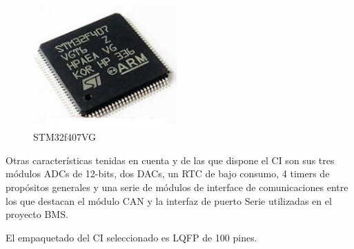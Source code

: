 \documentclass[10pt, a4paper]{report}
\begin{document}
\begin{figure}
    \includegraphics[width=5.5cm]{STM32F407VG.png}
    \caption{STM32f407VG}
    \label{fig:stm32f407vg}                                                            
\end{figure}                                                                 

Otras características tenidas en cuenta y de las que dispone el \acrshort{CI}
son sus tres módulos ADCs de 12-bits, dos DACs, un \acrshort{RTC} de
bajo consumo, 4 timers de propósitos generales y una serie de módulos de
interface de comunicaciones entre los que destacan el módulo \acrshort{CAN} y la
interfaz de puerto Serie utilizadas en el proyecto \acrshort{BMS}.

El empaquetado del \acrshort{CI} seleccionado es \acrfull{LQFP} de 100 pines.
\end{document}
